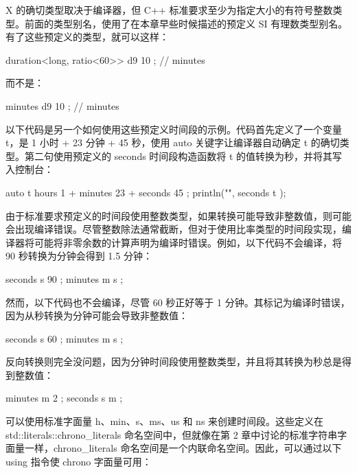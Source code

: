 X 的确切类型取决于编译器，但 C++ 标准要求至少为指定大小的有符号整数类型。前面的类型别名，使用了在本章早些时候描述的预定义 SI 有理数类型别名。有了这些预定义的类型，就可以这样：

\begin{cpp}
duration<long, ratio<60>> d9 { 10 }; // minutes
\end{cpp}

而不是：

\begin{cpp}
minutes d9 { 10 }; // minutes
\end{cpp}

以下代码是另一个如何使用这些预定义时间段的示例。代码首先定义了一个变量 t，是 1 小时 + 23 分钟 + 45 秒，使用 auto 关键字让编译器自动确定 t 的确切类型。第二句使用预定义的 seconds 时间段构造函数将 t 的值转换为秒，并将其写入控制台：

\begin{cpp}
auto t { hours { 1 } + minutes { 23 } + seconds { 45 } };
println("{}", seconds { t });
\end{cpp}

由于标准要求预定义的时间段使用整数类型，如果转换可能导致非整数值，则可能会出现编译错误。尽管整数除法通常截断，但对于使用比率类型的时间段实现，编译器将可能将非零余数的计算声明为编译时错误。例如，以下代码不会编译，将 90 秒转换为分钟会得到 1.5 分钟：

\begin{cpp}
seconds s { 90 };
minutes m { s };
\end{cpp}

然而，以下代码也不会编译，尽管 60 秒正好等于 1 分钟。其标记为编译时错误，因为从秒转换为分钟可能会导致非整数值：

\begin{cpp}
seconds s { 60 };
minutes m { s };
\end{cpp}

反向转换则完全没问题，因为分钟时间段使用整数类型，并且将其转换为秒总是得到整数值：

\begin{cpp}
minutes m { 2 };
seconds s { m };
\end{cpp}


可以使用标准字面量 h、min、s、ms、us 和 ns 来创建时间段。这些定义在 std::literals::chrono\_literals 命名空间中，但就像在第 2 章中讨论的标准字符串字面量一样，chrono\_literals 命名空间是一个内联命名空间。因此，可以通过以下 using 指令使 chrono 字面量可用：

